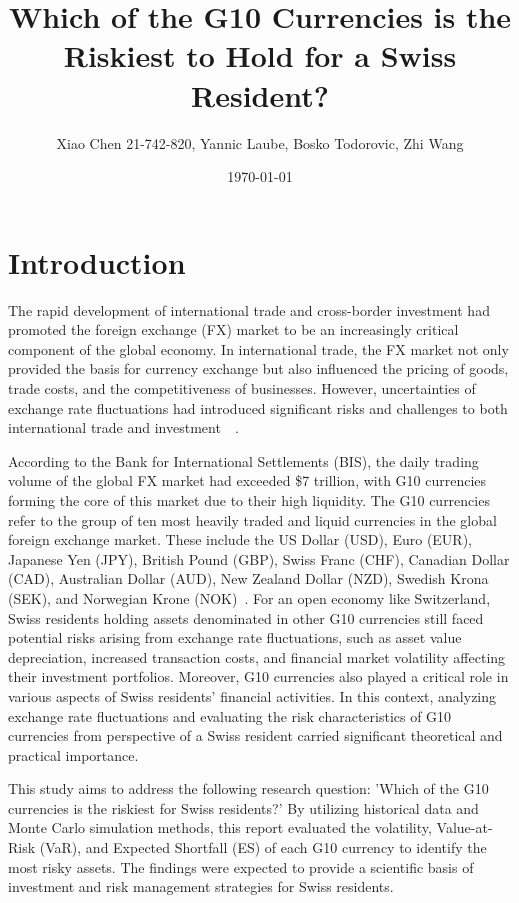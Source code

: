 \documentclass{article}
\title{\textbf{Which of the G10 Currencies is the Riskiest to Hold for a Swiss Resident?}}
\author{Xiao Chen 21-742-820, Yannic Laube, Bosko Todorovic, Zhi Wang}
\date{\today}
\begin{document}
\maketitle
\section{Introduction}
The rapid development of international trade and cross-border investment had promoted the foreign exchange (FX) market to be an increasingly critical component of the global economy. In international trade, the FX market not only provided the basis for currency exchange but also influenced the pricing of goods, trade costs, and the competitiveness of businesses. However, uncertainties of exchange rate fluctuations had introduced significant risks and challenges to both international trade and investment~\cite{AUBOIN_RUTA_2013}~\cite{riker2020review}.

According to the Bank for International Settlements (BIS), the daily trading volume of the global FX market had exceeded \$7 trillion, with G10 currencies forming the core of this market due to their high liquidity. The G10 currencies refer to the group of ten most heavily traded and liquid currencies in the global foreign exchange market. These include the US Dollar (USD), Euro (EUR), Japanese Yen (JPY), British Pound (GBP), Swiss Franc (CHF), Canadian Dollar (CAD), Australian Dollar (AUD), New Zealand Dollar (NZD), Swedish Krona (SEK), and Norwegian Krone (NOK)~\cite{bis2022report}. For an open economy like Switzerland, Swiss residents holding assets denominated in other G10 currencies still faced potential risks arising from exchange rate fluctuations, such as asset value depreciation, increased transaction costs, and financial market volatility affecting their investment portfolios. Moreover, G10 currencies also played a critical role in various aspects of Swiss residents' financial activities. In this context, analyzing exchange rate fluctuations and evaluating the risk characteristics of G10 currencies from perspective of a Swiss resident carried significant theoretical and practical importance.

This study aims to address the following research question: 'Which of the G10 currencies is the riskiest for Swiss residents?' By utilizing historical data and Monte Carlo simulation methods, this report evaluated the volatility, Value-at-Risk (VaR), and Expected Shortfall (ES) of each G10 currency to identify the most risky assets. The findings were expected to provide a scientific basis of investment and risk management strategies for Swiss residents.
\end{document}
